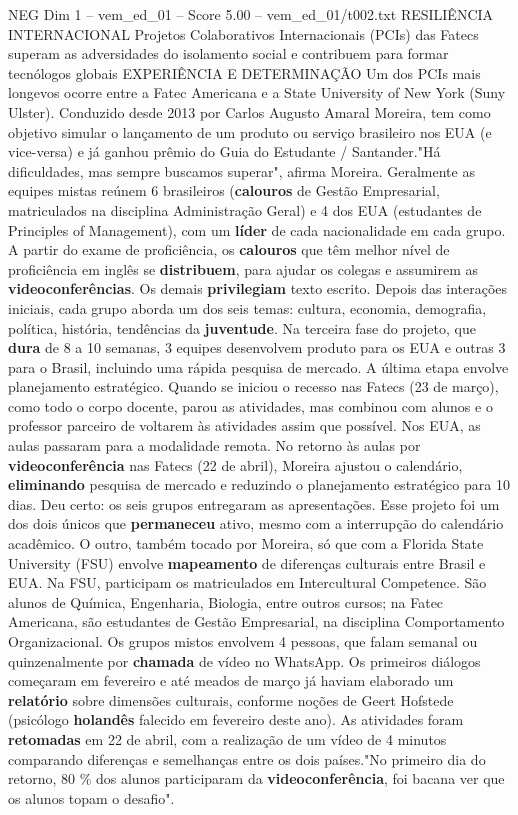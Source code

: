 \begin{textsample}{NEG Dim 1 – vem\_ed\_01 – Score 5.00 – vem\_ed\_01/t002.txt}  \label{ex:f1_neg_094}
RESILIÊNCIA INTERNACIONAL Projetos Colaborativos Internacionais (PCIs) das Fatecs superam as adversidades do isolamento social e contribuem para formar tecnólogos globais EXPERIÊNCIA E DETERMINAÇÃO Um dos PCIs mais longevos ocorre entre a Fatec Americana e a State University of New York (Suny Ulster).
Conduzido desde 2013 por Carlos Augusto Amaral Moreira, tem como objetivo simular o lançamento de um produto ou serviço brasileiro nos EUA (e vice-versa) e já ganhou prêmio do Guia do Estudante / Santander."Há dificuldades, mas sempre buscamos superar", afirma Moreira.
Geralmente as equipes mistas reúnem 6 brasileiros (\textbf{calouros} de Gestão Empresarial, matriculados na disciplina Administração Geral) e 4 dos EUA (estudantes de Principles of Management), com um \textbf{líder} de cada nacionalidade em cada grupo.
A partir do exame de proficiência, os \textbf{calouros} que têm melhor nível de proficiência em inglês se \textbf{distribuem}, para ajudar os colegas e assumirem as \textbf{videoconferências}.
Os demais \textbf{privilegiam} texto escrito.
Depois das interações iniciais, cada grupo aborda um dos seis temas: cultura, economia, demografia, política, história, tendências da \textbf{juventude}.
Na terceira fase do projeto, que \textbf{dura} de 8 a 10 semanas, 3 equipes desenvolvem produto para os EUA e outras 3 para o Brasil, incluindo uma rápida pesquisa de mercado.
A última etapa envolve planejamento estratégico.
Quando se iniciou o recesso nas Fatecs (23 de março), como todo o corpo docente, parou as atividades, mas combinou com alunos e o professor parceiro de voltarem às atividades assim que possível.
Nos EUA, as aulas passaram para a modalidade remota.
No retorno às aulas por \textbf{videoconferência} nas Fatecs (22 de abril), Moreira ajustou o calendário, \textbf{eliminando} pesquisa de mercado e reduzindo o planejamento estratégico para 10 dias.
Deu certo: os seis grupos entregaram as apresentações.
Esse projeto foi um dos dois únicos que \textbf{permaneceu} ativo, mesmo com a interrupção do calendário acadêmico.
O outro, também tocado por Moreira, só que com a Florida State University (FSU) envolve \textbf{mapeamento} de diferenças culturais entre Brasil e EUA.
Na FSU, participam os matriculados em Intercultural Competence.
São alunos de Química, Engenharia, Biologia, entre outros cursos; na Fatec Americana, são estudantes de Gestão Empresarial, na disciplina Comportamento Organizacional.
Os grupos mistos envolvem 4 pessoas, que falam semanal ou quinzenalmente por \textbf{chamada} de vídeo no WhatsApp.
Os primeiros diálogos começaram em fevereiro e até meados de março já haviam elaborado um \textbf{relatório} sobre dimensões culturais, conforme noções de Geert Hofstede (psicólogo \textbf{holandês} falecido em fevereiro deste ano).
As atividades foram \textbf{retomadas} em 22 de abril, com a realização de um vídeo de 4 minutos comparando diferenças e semelhanças entre os dois países."No primeiro dia do retorno, 80 \% dos alunos participaram da \textbf{videoconferência}, foi bacana ver que os alunos topam o desafio".

\end{textsample}
